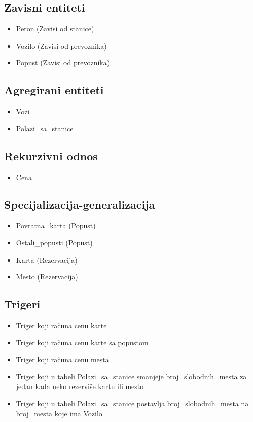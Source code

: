 \documentclass[12pt]{article}
\begin{document}
\subsection{Zavisni entiteti}
\begin{itemize}
	\item Peron (Zavisi od stanice)
	\item Vozilo (Zavisi od prevoznika)
	\item Popust (Zavisi od prevoznika)
\end{itemize}

\subsection{Agregirani entiteti}
\begin{itemize}
	\item Vozi
	\item Polazi\_sa\_stanice
\end{itemize}

\subsection{Rekurzivni odnos}
\begin{itemize}
	\item Cena
\end{itemize}

\subsection{Specijalizacija-generalizacija}
\begin{itemize}
	\item Povratna\_karta (Popust)
	\item Ostali\_popusti (Popust)
	\item Karta (Rezervacija)
	\item Mesto (Rezervacija)
\end{itemize}

\subsection{Trigeri}
\begin{itemize}
	\item Triger koji ra\v cuna cenu karte
	\item Triger koji ra\v cuna cenu karte sa popustom
	\item Triger koji ra\v cuna cenu mesta
	\item Triger koji u tabeli Polazi\_sa\_stanice smanjeje broj\_slobodnih\_mesta za jedan kada neko rezervi\v se kartu ili mesto
	\item Triger koji u tabeli Polazi\_sa\_stanice postavlja broj\_slobodnih\_mesta na broj\_mesta koje ima Vozilo
\end{itemize}
\end{document}
